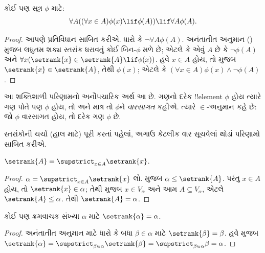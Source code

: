 \documentclass[../../../include/open-logic-section]{subfiles}
\begin{document}
\begin{thm}[$\in$-અનુમાનનું પ્રરૂપ] 
કોઈ પણ સૂત્ર $\phi$ માટે:
\[
	\forall A((\forall x \in A)\phi(x) \lif \phi(A)) \lif \forall A \phi(A).
\]
\end{thm}

\begin{proof}
આપણે પ્રતિવિધાન સાબિત કરીએ. ધારો કે $\lnot \forall A
\phi(A)$. અનંતાતીત અનુમાન
() મુજબ
લઘુતમ શક્ય સ્તરાંક ધરાવતું કોઈ બિન-$\phi$ મળે છે;
એટલે કે એવું $A$ છે કે $\lnot \phi(A)$ અને
$\forall x(\setrank{x} \in \setrank{A}
\lif \phi(x))$. હવે $x \in A$ હોય, તો
 મુજબ $\setrank{x} \in
\setrank{A}$, તેથી $\phi(x)$; એટલે કે $(\forall x \in
A)\phi(x) \land \lnot \phi(A)$.
\end{proof}\noindent આ શક્તિશાળી પરિણામનો અનૌપચારિક અર્થ આ છે.
ગણનો દરેક !!{element} $\phi$ હોય ત્યારે ગણ પોતે પણ
$\phi$ હોય, તો અને માત્ર તો $\phi$ને \emph{વારસાગત}
કહીએ. ત્યારે $\in$-અનુમાન કહે છે: જો $\phi$ વારસાગત હોય,
તો દરેક ગણ $\phi$ છે.

સ્તરાંકોની ચર્ચા (હાલ માટે) પૂરી કરતાં પહેલાં, અગાઉ
કેટલીક વાર સૂચવેલાં થોડાં પરિણામો સાબિત કરીએ.

\begin{prop}
$\setrank{A} = \supstrict_{x \in A}\setrank{x}$.
\end{prop}

\begin{proof}
$\alpha = \supstrict_{x \in A}\setrank{x}$ લો.
 મુજબ $\alpha \leq \setrank{A}$.
પરંતુ $x \in A$ હોય, તો $\setrank{x} \in \alpha$;
તેથી  મુજબ $x \in V_\alpha$ અને આમ $A
\subseteq V_\alpha$, એટલે $\setrank{A} \leq \alpha$.
તેથી $\setrank{A} = \alpha$.
\end{proof}

\begin{cor}
કોઈ પણ ક્રમવાચક સંખ્યા $\alpha$ માટે $\setrank{\alpha} = \alpha$.
\end{cor}

\begin{proof}
અનંતાતીત અનુમાન માટે ધારો કે બધા $\beta \in \alpha$ માટે
$\setrank{\beta} = \beta$. હવે  મુજબ
$\setrank{\alpha} = \supstrict_{\beta \in
\alpha}\setrank{\beta} = \supstrict_{\beta \in \alpha}\beta = \alpha$.
%
\end{proof}
\end{document}
